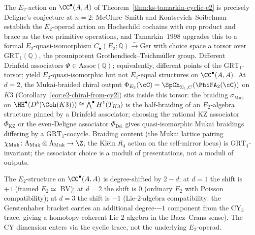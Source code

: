 \begin{remark}[Deligne's \texorpdfstring{$E_2$}{E-2} at \texorpdfstring{$n=2$}{n=2} as Kontsevich--Tamarkin formality up to \texorpdfstring{$\mathrm{GRT}_1$}{GRT-1}]
\label{rem:deligne-kt-grt1-e2}
The $E_2$-action on $\CC^\bullet(A, A)$ of Theorem~\ref{thm:ks-tamarkin-cyclic-e2} is precisely Deligne's conjecture at $n = 2$: McClure--Smith and Kontsevich--Soibelman establish the $E_2$-operad action on Hochschild cochains with cup product and brace as the two primitive operations, and Tamarkin~$1998$ upgrades this to a formal $E_2$-quasi-isomorphism $C_\bullet(E_2; \mathbb{Q}) \xrightarrow{\sim} \mathrm{Ger}$ with choice space a torsor over $\mathrm{GRT}_1(\mathbb{Q})$, the prounipotent Grothendieck--Teichm\"uller group. Different Drinfeld associators $\Phi \in \mathrm{Assoc}(\mathbb{Q})$; equivalently, different points of the $\mathrm{GRT}_1$-torsor; yield $E_2$-quasi-isomorphic but not $E_2$-equal structures on $\CC^\bullet(A, A)$. At $d = 2$, the Mukai-braided chiral output
$\Phi_{E_2}(\cC) = \SpCh_{\Sigma_1, C}(\PhiFA_2(\cC))$
on $K3$ (Corollary~\ref{cor:e2-chiral-from-cy2}) sits inside this torsor: the braiding $\sigma_{\mathrm{Muk}}$ on $\HH^\bullet(D^b(\Coh(K3))) \cong \bigwedge^\bullet H^1(T_{K3})$ is the half-braiding of an $E_2$-algebra structure pinned by a Drinfeld associator; choosing the rational KZ associator $\Phi_{\mathrm{KZ}}$ or the even-Deligne associator $\Phi_{\mathrm{Del}}$ gives quasi-isomorphic Mukai braidings differing by a $\mathrm{GRT}_1$-cocycle. Braiding content (the Mukai lattice pairing $\chi_{\mathrm{Muk}} \colon \Lambda_{\mathrm{Muk}} \otimes \Lambda_{\mathrm{Muk}} \to \Z$, the Kl\"ein $\mathfrak{K}_4$ action on the self-mirror locus) is $\mathrm{GRT}_1$-invariant; the associator choice is a moduli of presentations, not a moduli of outputs.
\end{remark}

\begin{remark}
\label{rem:cy-dim-shift}
The $E_2$-structure on $\CC^\bullet(A,A)$ is degree-shifted by $2-d$:
at $d=1$ the shift is $+1$ (framed $E_2 \simeq$ BV); at $d=2$ the
shift is $0$ (ordinary $E_2$ with Poisson compatibility); at $d=3$ the
shift is $-1$ (Lie-$2$-algebra compatibility: the Gerstenhaber bracket
carries an additional degree-$-1$ component from the CY$_3$ trace,
giving a homotopy-coherent Lie $2$-algebra in the Baez--Crans sense).
The CY dimension enters via the cyclic trace, not the underlying
$E_2$-operad.
\end{remark}

